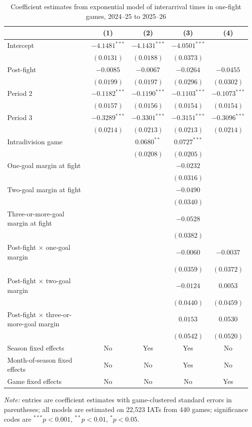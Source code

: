 \begin{table}[!h]
\centering
\caption{Coefficient estimates from exponential model of interarrival times in one-fight games, 2024--25 to 2025--26}
\label{tab:iat_regression_20242025_20252026}
\scriptsize
\renewcommand{\arraystretch}{1.12}
\setlength{\tabcolsep}{5pt}

\begin{tabular*}{\textwidth}{@{\extracolsep{\fill}}lcccc}
\toprule
 & (1) & (2) & (3) & (4) \\
\midrule
Intercept & $-4.1481^{***}$ & $-4.1431^{***}$ & $-4.0501^{***}$ &  \\
 & $(0.0131)$ & $(0.0188)$ & $(0.0373)$ &  \\
Post-fight & $-0.0085$ & $-0.0067$ & $-0.0264$ & $-0.0455$ \\
 & $(0.0199)$ & $(0.0197)$ & $(0.0296)$ & $(0.0302)$ \\
Period 2 & $-0.1182^{***}$ & $-0.1190^{***}$ & $-0.1103^{***}$ & $-0.1073^{***}$ \\
 & $(0.0157)$ & $(0.0156)$ & $(0.0154)$ & $(0.0154)$ \\
Period 3 & $-0.3289^{***}$ & $-0.3301^{***}$ & $-0.3151^{***}$ & $-0.3096^{***}$ \\
 & $(0.0214)$ & $(0.0213)$ & $(0.0213)$ & $(0.0214)$ \\
Intradivision game &  & $0.0680^{**}$ & $0.0727^{***}$ &  \\
 &  & $(0.0208)$ & $(0.0205)$ &  \\
One-goal margin at fight &  &  & $-0.0232$ &  \\
 &  &  & $(0.0316)$ &  \\
Two-goal margin at fight &  &  & $-0.0490$ &  \\
 &  &  & $(0.0340)$ &  \\
Three-or-more-goal margin at fight &  &  & $-0.0528$ &  \\
 &  &  & $(0.0382)$ &  \\
Post-fight $\times$ one-goal margin &  &  & $-0.0060$ & $-0.0037$ \\
 &  &  & $(0.0359)$ & $(0.0372)$ \\
Post-fight $\times$ two-goal margin &  &  & $-0.0124$ & $0.0053$ \\
 &  &  & $(0.0440)$ & $(0.0459)$ \\
Post-fight $\times$ three-or-more-goal margin &  &  & $0.0153$ & $0.0530$ \\
 &  &  & $(0.0542)$ & $(0.0520)$ \\
\midrule
Season fixed effects & No & Yes & Yes & No \\
Month-of-season fixed effects & No & No & Yes & No \\
Game fixed effects & No & No & No & Yes \\
\bottomrule
\end{tabular*}

\vspace{0.4em}
\parbox{0.95\textwidth}{
\footnotesize
\textit{Note:} entries are coefficient estimates with game-clustered standard errors in parentheses; all models are estimated on 22,523 IATs from 440 games; significance codes are $^{***}p<0.001$, $^{**}p<0.01$, $^{*}p<0.05$.
}
\end{table}
